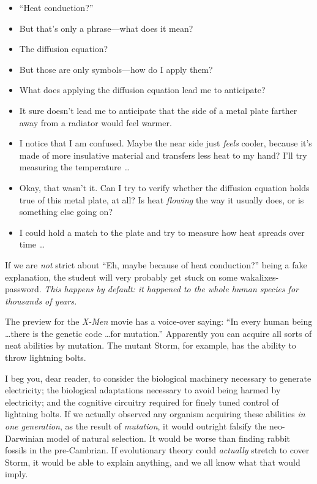 \begin{itemize}
\item {
 ``Heat conduction?''}

\item {
 But that's only a phrase---what does it mean?}

\item {
 The diffusion equation?}

\item {
 But those are only symbols---how do I apply them?}

\item {
 What does applying the diffusion equation lead me to anticipate?}

\item {
 It sure doesn't lead me to anticipate that the
side of a metal plate farther away from a radiator would feel warmer.}

\item {
 I notice that I am confused. Maybe the near side just
\textit{feels} cooler, because it's made of more
insulative material and transfers less heat to my hand?
I'll try measuring the temperature \ldots}

\item {
 Okay, that wasn't it. Can I try to verify whether
the diffusion equation holds true of this metal plate, at all? Is heat
\textit{flowing} the way it usually does, or is something else going
on?}

\item {
 I could hold a match to the plate and try to measure how heat
 spreads over time \ldots}
\end{itemize}

{
 If we are \textit{not} strict about ``Eh, maybe
because of heat conduction?'' being a fake
explanation, the student will very probably get stuck on some
wakalixes-password. \textit{This happens by default: it happened to the
whole human species for thousands of years.}}

\myendsectiontext


{
 The preview for the \textit{X-Men} movie has a voice-over saying:
``In every human being \ldots there is the genetic code
\ldots for mutation.'' Apparently you can acquire all
sorts of neat abilities by mutation. The mutant Storm, for example, has
the ability to throw lightning bolts.}

{
 I beg you, dear reader, to consider the biological machinery
necessary to generate electricity; the biological adaptations necessary
to avoid being harmed by electricity; and the cognitive circuitry
required for finely tuned control of lightning bolts. If we actually
observed any organism acquiring these abilities \textit{in one
generation}, as the result of \textit{mutation}, it would outright
falsify the neo-Darwinian model of natural selection. It would be worse
than finding rabbit fossils in the pre-Cambrian. If evolutionary theory
could \textit{actually} stretch to cover Storm, it would be able to
explain anything, and we all know what that would imply.}

